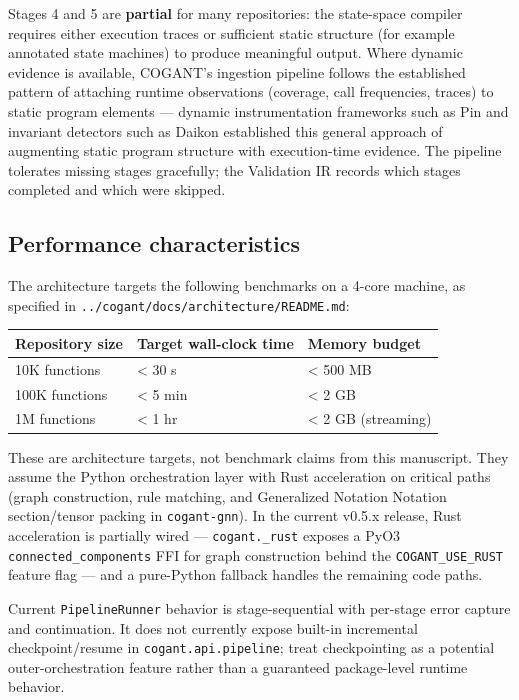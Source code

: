 \documentclass[
]{article}
\newcounter{none} %
\begin{document}
Stages 4 and 5 are \textbf{partial} for many repositories: the
state-space compiler requires either execution traces or sufficient
static structure (for example annotated state machines) to produce
meaningful output. Where dynamic evidence is available, COGANT's
ingestion pipeline follows the established pattern of attaching runtime
observations (coverage, call frequencies, traces) to static program
elements --- dynamic instrumentation frameworks such as Pin
\citep{luk2005pin} and invariant detectors such as Daikon
\citep{ernst2007daikon} established this general approach of augmenting
static program structure with execution-time evidence. The pipeline
tolerates missing stages gracefully; the Validation IR records which
stages completed and which were skipped.

\subsection{Performance
characteristics}\label{performance-characteristics-1}

The architecture targets the following benchmarks on a 4-core machine,
as specified in \texttt{../cogant/docs/architecture/README.md}:

{\def\LTcaptype{none} %
\begin{longtable}[]{@{}lll@{}}
\toprule\noalign{}
Repository size & Target wall-clock time & Memory budget \\
\midrule\noalign{}
\endhead
\bottomrule\noalign{}
\endlastfoot
10K functions & \textless{} 30 s & \textless{} 500 MB \\
100K functions & \textless{} 5 min & \textless{} 2 GB \\
1M functions & \textless{} 1 hr & \textless{} 2 GB (streaming) \\
\end{longtable}
}

These are architecture targets, not benchmark claims from this
manuscript. They assume the Python orchestration layer with Rust
acceleration on critical paths (graph construction, rule matching, and
Generalized Notation Notation section/tensor packing in
\texttt{cogant-gnn}). In the current v0.5.x release, Rust acceleration
is partially wired --- \texttt{cogant.\_rust} exposes a PyO3
\texttt{connected\_components} FFI for graph construction behind the
\texttt{COGANT\_USE\_RUST} feature flag --- and a pure-Python fallback
handles the remaining code paths.

Current \texttt{PipelineRunner} behavior is stage-sequential with
per-stage error capture and continuation. It does not currently expose
built-in incremental checkpoint/resume in \texttt{cogant.api.pipeline};
treat checkpointing as a potential outer-orchestration feature rather
than a guaranteed package-level runtime behavior.
\end{document}
